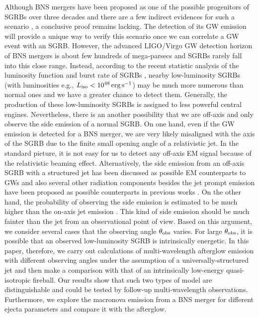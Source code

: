\documentclass{emulateapj}
\begin{document}
Although BNS mergers have been proposed as one of the possible progenitors of SGRBs over three decades \citep{pac86, eich89, nar92, moch93} and there are a few indirect evidences for such a scenario \citep[e.g., for reviews see][]{nak07, ber14}, a conclusive proof remains lacking. The detection of its GW emission will provide a unique way to verify this scenario once we can correlate a GW event with an SGRB. However, the advanced LIGO/Virgo GW detection horizon of BNS mergers is about few hundreds of mega-parsecs \citep{aba10, mar16} and SGRBs rarely fall into this close range. Instead, according to the recent statistic analysis of the luminosity function and burst rate of SGRBs \citep{sun15, ghir16}, nearby low-luminosity SGRBs (with luminosities e.g., $L_{\rm iso}<10^{48}\,\rm erg\,s^{-1}$) may be much more numerous than normal ones and we have a greater chance to detect them. Generally, the production of these low-luminosity SGRBs is assigned to less powerful central engines. Nevertheless, there is an another possibility that we are off-axis and only observe the side emission of a normal SGRB. On one hand, even if the GW emission is detected for a BNS merger, we are very likely misaligned with the axis of the SGRB due to the finite small opening angle of a relativistic jet. In the standard picture, it is not easy for us to detect any off-axis EM signal because of the relativistic beaming effect. Alternatively, the side emission from an off-axis SGRB with a structured jet has been discussed as possible EM counterparts to GWs \citep{kath17} and also several other radiation components besides the jet prompt emission have been proposed as possible counterparts in previous works \citep{got17, lamb17, laz17a, laz17b, jin17}. On the other hand, the probability of observing the side emission is estimated to be much higher than the on-axis jet emission \citep{laz17b}. This kind of side emission should be much fainter than the jet from an observational point of view. Based on this argument, we consider several cases that the observing angle $\theta_{\rm obs}$ varies. For large $\theta_{\rm obs}$, it is possible that an observed low-luminosity SGRB is intrinsically energetic. In this paper, therefore, we carry out calculations of multi-wavelength afterglow emission with different observing angles under the assumption of a universally-structured jet and then make a comparison with that of an intrinsically low-energy quasi-isotropic fireball. Our results show that such two types of model are distinguishable and could be tested by follow-up multi-wavelength observations. Furthermore, we explore the macronova emission from a BNS merger for different ejecta parameters and compare it with the afterglow.
\end{document}
